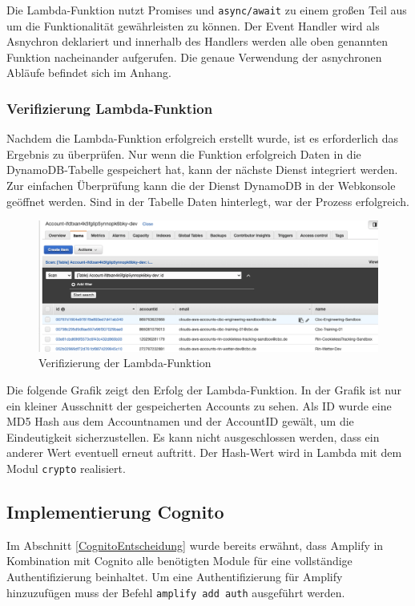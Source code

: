 Die Lambda-Funktion nutzt Promises und \verb+async/await+ zu einem großen Teil aus um die Funktionalität gewährleisten zu können.
Der Event Handler wird als Asnychron deklariert und innerhalb des Handlers werden alle oben genannten Funktion nacheinander aufgerufen.
Die genaue Verwendung der asnychronen Abläufe befindet sich im Anhang.

\subsubsection{Verifizierung Lambda-Funktion}

Nachdem die Lambda-Funktion erfolgreich erstellt wurde, ist es erforderlich das Ergebnis zu überprüfen.
Nur wenn die Funktion erfolgreich Daten in die DynamoDB-Tabelle gespeichert hat, kann der nächste Dienst integriert werden.
Zur einfachen Überprüfung kann die der Dienst DynamoDB in der Webkonsole geöffnet werden.
Sind in der Tabelle Daten hinterlegt, war der Prozess erfolgreich.

\begin{figure}[htbp]
    \centering
    \includegraphics[width=1.0\textwidth]{50-Implementierung/DynamoWeb.png}
    \caption{Verifizierung der Lambda-Funktion}
    \label{fig:meine-grafik}
\end{figure}

Die folgende Grafik zeigt den Erfolg der Lambda-Funktion.
In der Grafik ist nur ein kleiner Ausschnitt der gespeicherten Accounts zu sehen.
Als ID wurde eine MD5 Hash aus dem Accountnamen und der AccountID gewält, um die Eindeutigkeit sicherzustellen.
Es kann nicht ausgeschlossen werden, dass ein anderer Wert eventuell erneut auftritt.
Der Hash-Wert wird in Lambda mit dem Modul \verb+crypto+ realisiert.

\subsection{Implementierung Cognito}

Im Abschnitt \ref{CognitoEntscheidung}  wurde bereits erwähnt, dass Amplify in Kombination mit Cognito
alle benötigten Module für eine vollständige Authentifizierung beinhaltet.
Um eine Authentifizierung für Amplify hinzuzufügen muss der Befehl \verb+amplify add auth+ ausgeführt werden.

